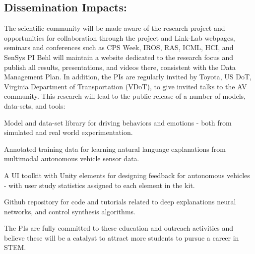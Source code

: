 \subsection{Dissemination Impacts:}
The scientific community will be made aware of the research project and opportunities for collaboration through the project and Link-Lab webpages, seminars and conferences such as CPS Week, IROS, RAS, ICML, HCI, and SenSys
PI Behl will maintain a website dedicated to the research focus and publish all results, presentations, and videos there, consistent with the Data Management Plan. 
In addition, the PIs are regularly invited by Toyota, US DoT, Virginia Department of Transportation (VDoT), to give invited talks to the AV community.
This research will lead to the public release of a number of models, data-sets, and tools:
\begin{enumerate*}
    \item Model and data-set library for driving behaviors and emotions - both from simulated and real world experimentation. 
    \item Annotated training data for learning natural language explanations from multimodal autonomous vehicle sensor data.
    \item A UI toolkit with Unity elements for designing feedback for autonomous vehicles - with user study statistics assigned to each element in the kit.
    \item Github repository for code and tutorials related to deep explanations neural networks, and control synthesis algorithms. 
\end{enumerate*}
The PIs are fully committed to these education and outreach activities and believe these will be a catalyst to attract more students to pursue a career in STEM.